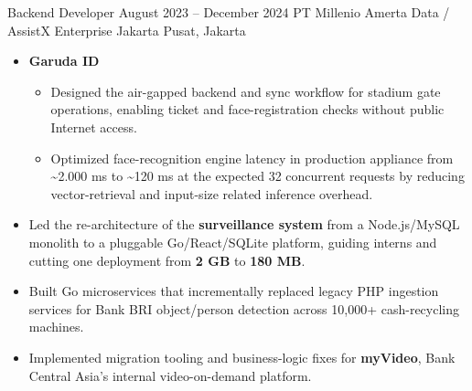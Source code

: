 \begin{jobentry}
	\role
	{Backend Developer}
	{August 2023 -- December 2024}
	{PT Millenio Amerta Data / AssistX Enterprise}
	{}
	{Jakarta Pusat, Jakarta}
	\begin{itemize}
		\item \textbf{Garuda ID}
		\begin{itemize}
			\item Designed the air-gapped backend and sync workflow for stadium gate operations, enabling ticket and face-registration checks without public Internet access.
			\item Optimized face-recognition engine latency in production appliance from \textasciitilde2.000 ms to \textasciitilde120 ms at the expected 32 concurrent requests by reducing vector-retrieval and input-size related inference overhead.
			\iftoggle{showOptionalExperience}{
			\item Provided operational documentation, on-site support, monitoring, and post-event data extraction during Indonesian national team matches against Japan and Saudi Arabia in November 2024.
			}{}
		\end{itemize}
		\item Led the re-architecture of the \textbf{surveillance system} from a Node.js/MySQL monolith to a pluggable Go/React/SQLite platform, guiding interns and cutting one deployment from \textbf{2 GB} to \textbf{180 MB}.
		      \iftoggle{showOptionalExperience}{
		\item Designed plugin integrations for camera stream compression via REST API and AI analytics via gRPC.
		      }{}
		\item Built Go microservices that incrementally replaced legacy PHP ingestion services for Bank BRI object/person detection across 10,000+ cash-recycling machines.
		\item Implemented migration tooling and business-logic fixes for \textbf{myVideo}, Bank Central Asia's internal video-on-demand platform.
	\end{itemize}
\end{jobentry}

